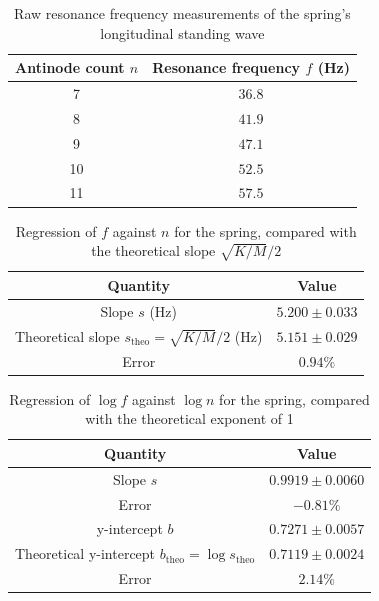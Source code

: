 \begin{table}[htb!]
\centering
\caption{Raw resonance frequency measurements of the spring's longitudinal standing wave}
\begin{tabular}{cc}
\toprule
Antinode count $n$ & Resonance frequency $f$ (\unit{\Hz}) \\
\midrule
7 & $36.8$ \\
8 & $41.9$ \\
9 & $47.1$ \\
10 & $52.5$ \\
11 & $57.5$ \\
\bottomrule
\end{tabular}
\end{table}
\begin{table}[htb!]
\centering
\caption{Regression of $f$ against $n$ for the spring, compared with the theoretical slope $\sqrt{K/M}/2$}
\begin{tabular}{cc}
\toprule
Quantity & Value \\
\midrule
Slope $s$ (\unit{\Hz}) & $5.200 \pm 0.033$ \\
Theoretical slope $s_{\text{theo}}=\sqrt{K/M}/2$ (\unit{\Hz}) & $5.151 \pm 0.029$ \\
Error & $0.94\%$ \\
\bottomrule
\end{tabular}
\end{table}
\begin{table}[htb!]
\centering
\caption{Regression of $\log f$ against $\log n$ for the spring, compared with the theoretical exponent of 1}
\begin{tabular}{cc}
\toprule
Quantity & Value \\
\midrule
Slope $s$ & $0.9919 \pm 0.0060$ \\
Error & $-0.81\%$ \\
y-intercept $b$ & $0.7271 \pm 0.0057$ \\
Theoretical y-intercept $b_{\text{theo}}=\log s_{\text{theo}}$ & $0.7119 \pm 0.0024$ \\
Error & $2.14\%$ \\
\bottomrule
\end{tabular}
\end{table}
